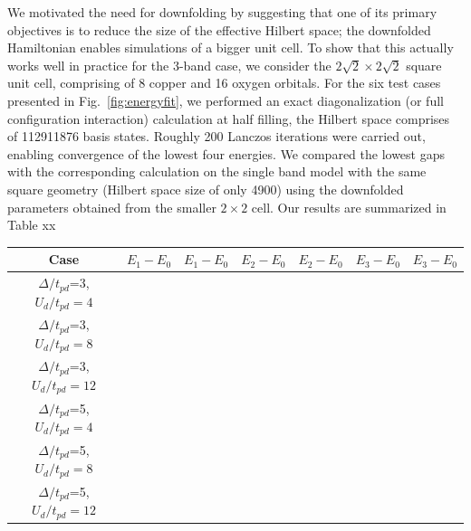 We motivated the need for downfolding by suggesting that one of its primary objectives 
is to reduce the size of the effective Hilbert space; the downfolded Hamiltonian enables 
simulations of a bigger unit cell. To show that this actually works well in practice for the 3-band case, 
we consider the $2\sqrt{2} \times 2 \sqrt{2}$ square unit cell, comprising of 8 copper and 16 oxygen orbitals. 
For the six test cases presented in Fig.~\ref{fig:energyfit}, we performed an exact diagonalization 
(or full configuration interaction) calculation at half filling, the Hilbert space comprises of 112911876 basis states. 
Roughly 200 Lanczos iterations were carried out, enabling convergence of the lowest four energies. 
We compared the lowest gaps with the corresponding calculation on the single 
band model with the same square geometry (Hilbert space size of only 4900) using the downfolded 
parameters obtained from the smaller $2 \times 2$ cell. Our results are summarized in Table xx

\begin{table}[ht]
\centering
\begin{tabular}{c||c|c||c|c||c|c|}
\hline
Case                             & $E_1-E_0$ & $E_1-E_0$ & $E_2-E_0$ & $E_2-E_0$ & $E_3-E_0$ & $E_3-E_0$ \\
\hline
$\Delta/t_{pd}$=3,$U_d/t_{pd}=4$ &           &           &           &           &           &        \\ 
$\Delta/t_{pd}$=3,$U_d/t_{pd}=8$ &           &           &           &           &           &        \\
$\Delta/t_{pd}$=3,$U_d/t_{pd}=12$ &           &           &           &           &           &       \\
\hline
\hline
$\Delta/t_{pd}$=5,$U_d/t_{pd}=4$ &           &           &           &           &           &        \\
$\Delta/t_{pd}$=5,$U_d/t_{pd}=8$ &           &           &           &           &           &        \\
$\Delta/t_{pd}$=5,$U_d/t_{pd}=12$ &           &           &           &           &           &       \\
\hline
\hline
\end{tabular}
\label{tab:predictivity}
\end{table} 



